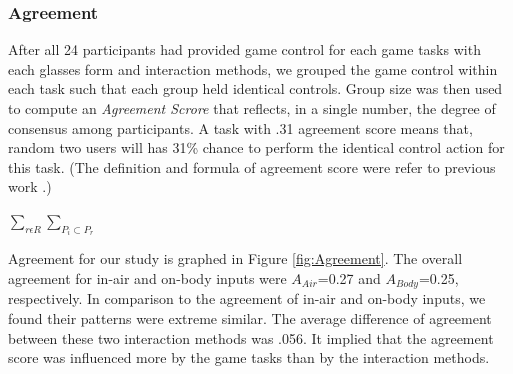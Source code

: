 \documentclass{sigchi}
\begin{document}
   \subsubsection{Agreement}
   After all 24 participants had provided game control for each game tasks with each glasses form and interaction methods, we grouped the game control within each task such that each group held identical controls. Group size was then used to compute an \emph{Agreement Scrore} that reflects, in a single number, the degree of consensus among participants. A task with .31 agreement score means that, random two users will has 31\% chance to perform the identical control action for this task. (The definition and formula of agreement score were refer to previous work \cite{Wobbrock:2005:MGS:1056808.1057043}.)

   $\sum_{r\epsilon R } \sum_{P_i \subset P_r }$

   Agreement for our study is graphed in Figure \ref{fig:Agreement}. The overall agreement for in-air and on-body inputs were $A_{Air}$=0.27 and $A_{Body}$=0.25, respectively. In comparison to the agreement of in-air and on-body inputs, we found their patterns were extreme similar. The average difference of agreement between these two interaction methods was .056. It implied that the agreement score was influenced more by the game tasks than by the interaction methods.
\end{document}
